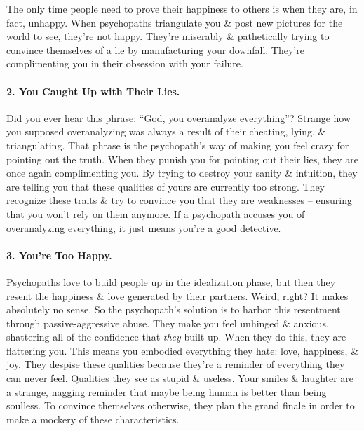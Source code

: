 \documentclass{article}
\numberwithin{equation}{section}
\begin{document}
The only time people need to prove their happiness to others is when they are, in fact, unhappy. When psychopaths triangulate you \& post new pictures for the world to see, they're not happy. They're miserably \& pathetically trying to convince themselves of a lie by manufacturing your downfall. They're complimenting you in their obsession with your failure.

\paragraph{2. You Caught Up with Their Lies.} Did you ever hear this phrase: ``God, you overanalyze everything''? Strange how you supposed overanalyzing was always a result of their cheating, lying, \& triangulating. That phrase is the psychopath's way of making you feel crazy for pointing out the truth. When they punish you for pointing out their lies, they are once again complimenting you. By trying to destroy your sanity \& intuition, they are telling you that these qualities of yours are currently too strong. They recognize these traits \& try to convince you that they are weaknesses -- ensuring that you won't rely on them anymore. If a psychopath accuses you of overanalyzing everything, it just means you're a good detective.

\paragraph{3. You're Too Happy.} Psychopaths love to build people up in the idealization phase, but then they resent the happiness \& love generated by their partners. Weird, right? It makes absolutely no sense. So the psychopath's solution is to harbor this resentment through passive-aggressive abuse. They make you feel unhinged \& anxious, shattering all of the confidence that \textit{they} built up. When they do this, they are flattering you. This means you embodied everything they hate: love, happiness, \& joy. They despise these qualities because they're a reminder of everything they can never feel. Qualities they see as stupid \& useless. Your smiles \& laughter are a strange, nagging reminder that maybe being human is better than being soulless. To convince themselves otherwise, they plan the grand finale in order to make a mockery of these characteristics.
\end{document}
